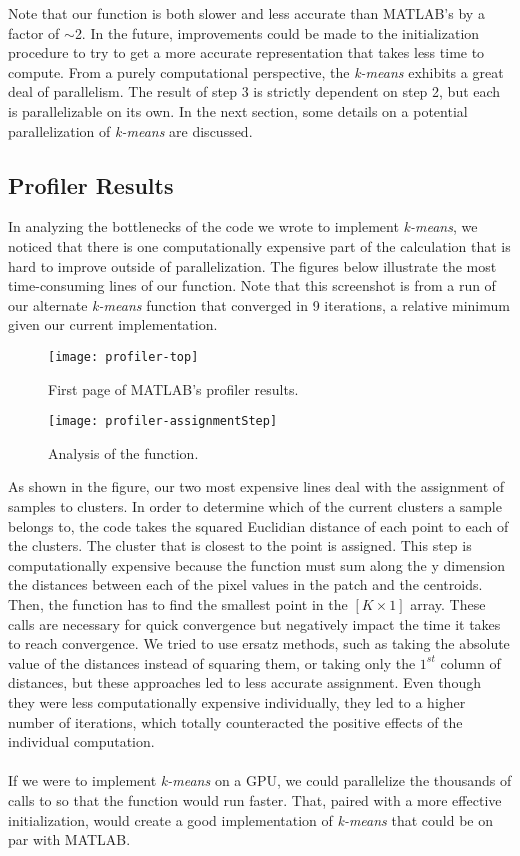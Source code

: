 \documentclass[]{../ncmathy}
\begin{document}
			Note that our function is both slower and less accurate than MATLAB's by a factor of $\sim$2. In the future, improvements could be made to the initialization procedure to try to get a more accurate representation that takes less time to compute. From a purely computational perspective, the \textit{k-means} exhibits a great deal of parallelism. The result of step 3 is strictly dependent on step 2, but each is parallelizable on its own. In the next section, some details on a potential parallelization of \textit{k-means} are discussed.
	
	\subsection{Profiler Results}
		In analyzing the bottlenecks of the code we wrote to implement \textit{k-means}, we noticed that there is one computationally expensive part of the calculation that is hard to improve outside of parallelization. The figures below illustrate the most time-consuming lines of our function. Note that this screenshot is from a run of our alternate \textit{k-means} function that converged in 9 iterations, a relative minimum given our current implementation.
		
		\begin{figure}[H]
		\centering\texttt{[image: profiler-top]}
		\caption{First page of MATLAB's profiler results.}
		\end{figure}

		\begin{figure}[H]
		\centering\texttt{[image: profiler-assignmentStep]}
		\caption{Analysis of the  function.}
		\end{figure}
		
		As shown in the figure, our two most expensive lines deal with the assignment of samples to clusters. In order to determine which of the current clusters a sample belongs to, the code takes the squared Euclidian distance of each point to each of the clusters. The cluster that is closest to the point is assigned. This step is computationally expensive because the function  must sum along the y dimension the distances between each of the pixel values in the patch and the centroids. Then, the  function has to find the smallest point in the $[K\times 1]$ array. These calls are necessary for quick convergence but negatively impact the time it takes to reach convergence. We tried to use ersatz methods, such as taking the absolute value of the distances instead of squaring them, or taking only the $1^{st}$ column of distances, but these approaches led to less accurate assignment. Even though they were less computationally expensive individually, they led to a higher number of iterations, which totally counteracted the positive effects of the individual computation. 
		\\\\
		If we were to implement \textit{k-means} on a GPU, we could parallelize the thousands of calls to  so that the function would run faster. That, paired with a more effective initialization, would create a good implementation of \textit{k-means} that could be on par with MATLAB.
\end{document}

